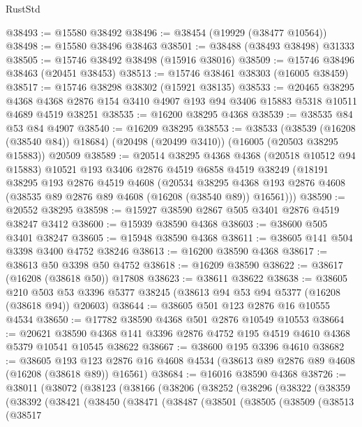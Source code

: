 \begin{lexlean}{RustStd}
\begin{coremodule}
@38493 := @15580 @38492
@38496 := @38454 (@19929 (@38477 @10564))
@38498 := @15580 @38496 @38463
@38501 := @38488 (@38493 @38498) @31333
@38505 := @15746 @38492 @38498 (@15916 @38016)
@38509 := @15746 @38496 @38463 (@20451 @38453)
@38513 := @15746 @38461 @38303 (@16005 @38459)
@38517 := @15746 @38298 @38302 (@15921 @38135)
@38533 := @20465
    @38295
    @4368
    @4368
    @2876
    @154
    @3410
    @4907
    @193
    @94
    @3406
    @15883
    @5318
    @10511
    @4689
    @4519
    @38251
@38535 := @16200 @38295 @4368
@38539 := @38535 @84 @53 @84 @4907
@38540 := @16209 @38295
@38553 := @38533
    (@38539 (@16208 (@38540 @84)) @18684)
    (@20498 (@20499 @3410))
    (@16005 (@20503 @38295 @15883))
    @20509
@38589 := @20514
    @38295
    @4368
    @4368
    (@20518 @10512 @94 @15883)
    @10521
    @193
    @3406
    @2876
    @4519
    @6858
    @4519
    @38249
    (@18191
      @38295
      @193
      @2876
      @4519
      @4608
      (@20534
        @38295
        @4368
        @193
        @2876
        @4608
        (@38535 @89 @2876 @89 @4608 (@16208 (@38540 @89)) @16561)))
@38590 := @20552 @38295
@38598 := @15927 @38590 @2867 @505 @3401 @2876 @4519 @38247 @3412
@38600 := @15939 @38590 @4368
@38603 := @38600 @505 @3401 @38247
@38605 := @15948 @38590 @4368
@38611 := @38605 @141 @504 @3398 @3400 @4752 @38246
@38613 := @16200 @38590 @4368
@38617 := @38613 @50 @3398 @50 @4752
@38618 := @16209 @38590
@38622 := @38617 (@16208 (@38618 @50)) @17808
@38623 := @38611 @38622
@38638 := @38605
    @210
    @503
    @53
    @3396
    @5377
    @38245
    (@38613 @94 @53 @94 @5377 (@16208 (@38618 @94)) @20603)
@38644 := @38605 @501 @123 @2876 @16 @10555 @4534
@38650 := @17782 @38590 @4368 @501 @2876 @10549 @10553
@38664 := @20621
    @38590
    @4368
    @141
    @3396
    @2876
    @4752
    @195
    @4519
    @4610
    @4368
    @5379
    @10541
    @10545
    @38622
@38667 := @38600 @195 @3396 @4610
@38682 := @38605
    @193
    @123
    @2876
    @16
    @4608
    @4534
    (@38613 @89 @2876 @89 @4608 (@16208 (@38618 @89)) @16561)
@38684 := @16016 @38590 @4368
@38726 := @38011
    (@38072
      (@38123
        (@38166
          (@38206
            (@38252
              (@38296
                (@38322
                  (@38359
                    (@38392
                      (@38421
                        (@38450
                          (@38471
                            (@38487
                              (@38501
                                (@38505
                                  (@38509
                                    (@38513
                                      (@38517

\end{coremodule}
\end{lexlean}
